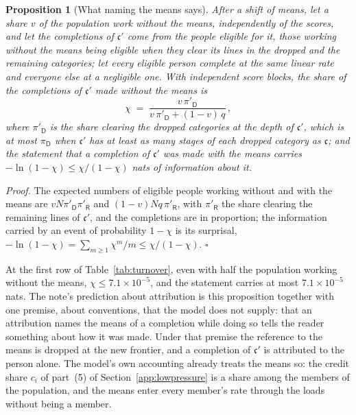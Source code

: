 \documentclass{article}
\newtheorem{proposition}{Proposition}
\begin{document}
\begin{proposition}[What naming the means says]\label{prop:attribution}
After a shift of means, let a share $v$ of the population work without the means, independently of the scores, and let the completions of $\mathfrak{c}'$ come from the people eligible for it, those working without the means being eligible when they clear its lines in the dropped and the remaining categories; let every eligible person complete at the same linear rate and everyone else at a negligible one. With independent score blocks, the share of the completions of $\mathfrak{c}'$ made without the means is
\begin{equation}\label{eq:unmeans}
  \chi \;=\; \frac{v\,\pi'_{\mathsf{D}}}{v\,\pi'_{\mathsf{D}} + (1 - v)\,q}\,,
\end{equation}
where $\pi'_{\mathsf{D}}$ is the share clearing the dropped categories at the depth of $\mathfrak{c}'$, which is at most $\pi_{\mathsf{D}}$ when $\mathfrak{c}'$ has at least as many stages of each dropped category as $\mathfrak{c}$; and the statement that a completion of $\mathfrak{c}'$ was made with the means carries $-\ln(1 - \chi) \leq \chi/(1 - \chi)$ nats of information about it.
\end{proposition}

\noindent\textit{Proof.} The expected numbers of eligible people working without and with the means are $vN\pi'_{\mathsf{D}}\pi'_{\mathsf{R}}$ and $(1 - v)Nq\,\pi'_{\mathsf{R}}$, with $\pi'_{\mathsf{R}}$ the share clearing the remaining lines of $\mathfrak{c}'$, and the completions are in proportion; the information carried by an event of probability $1 - \chi$ is its surprisal, $-\ln(1 - \chi) = \sum_{m \geq 1}\chi^m/m \leq \chi/(1 - \chi)$. $\square$

At the first row of Table~\ref{tab:turnover}, even with half the population working without the means, $\chi \leq 7.1 \times 10^{-5}$, and the statement carries at most $7.1 \times 10^{-5}$ nats. The note's prediction about attribution is this proposition together with one premise, about conventions, that the model does not supply: that an attribution names the means of a completion while doing so tells the reader something about how it was made. Under that premise the reference to the means is dropped at the new frontier, and a completion of $\mathfrak{c}'$ is attributed to the person alone. The model's own accounting already treats the means so: the credit share $c_i$ of part~(5) of Section~\ref{app:lowpressure} is a share among the members of the population, and the means enter every member's rate through the loads without being a member.
\end{document}
